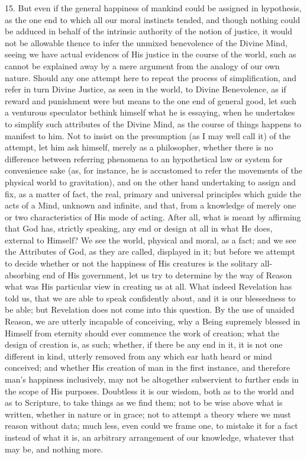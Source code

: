 15. But even if the general happiness of mankind could be assigned
in hypothesis, as the one end to which all our moral instincts tended,
and though nothing could be adduced in behalf of the intrinsic
authority of the notion of justice, it would not be allowable thence
to infer the unmixed benevolence of the Divine Mind, seeing we have
actual evidences of His justice in the course of the world, such as
cannot be explained away by a mere argument from the analogy of our
own nature. Should any one attempt here to repeat the process of
simplification, and refer in turn Divine Justice, as seen in the
world, to Divine Benevolence, as if reward and punishment were but
means to the one end of general good, let such a venturous speculator
bethink himself what he is essaying, when he undertakes to simplify
such attributes of the Divine Mind, as the course of things happens to
manifest to him. Not to insist on the presumption (as I may well call
it) of the attempt, let him ask himself, merely as a philosopher,
whether there is no difference between referring phenomena to an
hypothetical law or system for convenience sake (as, for instance, he
is accustomed to refer the movements of the physical world to
gravitation), and on the other hand undertaking to assign and fix, as
a matter of fact, the real, primary and universal principles which
guide the acts of a Mind, unknown and infinite, and that, from a
knowledge of merely one or two characteristics of His mode of acting.
After all, what is meant by affirming that God has, strictly speaking,
any end or design at all in what He does, external to Himself? We see
the world, physical and moral, as a fact; and we see the Attributes of
God, as they are called, displayed in it; but before we attempt to
decide whether or not the happiness of His creatures is the solitary
all-absorbing end of His government, let us try to determine by the
way of Reason what was His particular view in creating us at all. What
indeed Revelation has told us, that we are able to speak confidently
about, and it is our blessedness to be able; but Revelation does not
come into this question. By the use of unaided Reason, we are utterly
incapable of conceiving, why a Being supremely blessed in Himself from
eternity should ever commence the work of creation; what the design of
creation is, as such; whether, if there be any end in it, it is not
one different in kind, utterly removed from any which ear hath heard
or mind conceived; and whether His creation of man in the first
instance, and therefore man's happiness inclusively, may not be
altogether subservient to further ends in the scope of His purposes.
Doubtless it is our wisdom, both as to the world and as to Scripture,
to take things as we find them; not to be wise above what is written,
whether in nature or in grace; not to attempt a theory where we must
reason without data; much less, even could we frame one, to mistake it
for a fact instead of what it is, an arbitrary arrangement of our
knowledge, whatever that may be, and nothing more.


